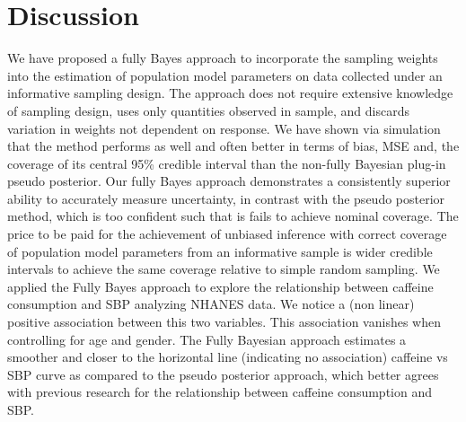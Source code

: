 \documentclass[]{imsart}
\begin{document}
\section{Discussion}\label{sec:discussion}
We have proposed a fully Bayes approach to incorporate the sampling weights into the estimation of population model
parameters on data collected under an informative sampling design.  The approach does not require extensive knowledge of sampling design, uses only quantities observed in sample, and discards variation in weights not dependent on response.
We have shown via simulation that the method performs as well and often better in terms
of bias, MSE and, the coverage of its central 95\% credible interval than the non-fully Bayesian plug-in pseudo posterior.
Our fully Bayes approach demonstrates a consistently superior ability to accurately measure uncertainty, in contrast
with the pseudo posterior method, which is too confident such that is fails to achieve nominal coverage.  The price to be paid for the achievement of unbiased inference with correct coverage of population model parameters from an informative sample is wider credible intervals to achieve the same coverage relative to simple random sampling.
We applied the Fully Bayes approach to explore the relationship between caffeine consumption and SBP
analyzing NHANES data. We notice a (non linear) positive association between this two variables. This association vanishes when controlling for age and gender. The Fully Bayesian approach estimates a smoother and closer to the horizontal line (indicating no association) caffeine vs SBP curve as compared to the pseudo posterior approach, which better agrees with previous research for the relationship between caffeine consumption and SBP.
\end{document}
